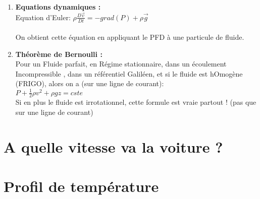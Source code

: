 \documentclass{article}
\begin{document}
\begin{enumerate}
\item \textbf{Equations dynamiques : }\\[0.1cm]

Equation d'Euler: $\rho \frac{D\vec{v}}{Dt} = -grad(P) + \rho \vec{g} $\\[0.1cm] 
\\
On obtient cette équation en appliquant le PFD à une particule de fluide. 

\item \textbf{ Théorème de Bernoulli : }\\[0.1cm]
Pour un Fluide parfait, en Régime stationnaire, dans un écoulement Incompressible , dans un référentiel Galiléen, et si le fluide est hOmogène (FRIGO),  alors on a (sur une ligne de courant): \\[0.1cm]
$P + \frac{1}{2} \rho v^2 + \rho g z = cste$\\[0.1cm]

Si en plus le fluide est irrotationnel, cette formule est vraie partout ! (pas que sur une ligne de courant)
\end{enumerate}
\section{A quelle vitesse va la voiture ? }

\section{Profil de température}
\end{document}
